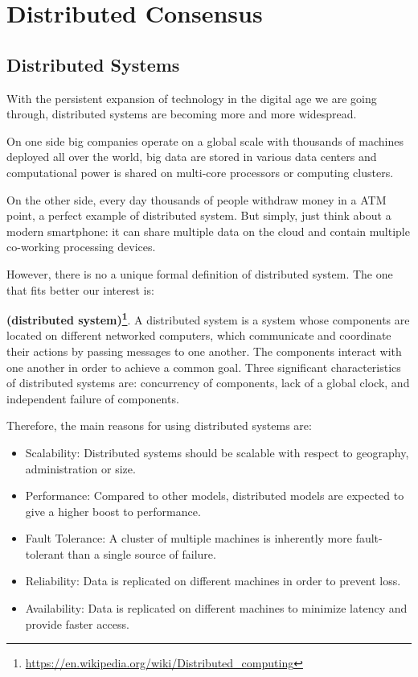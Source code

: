 \chapter{Distributed Consensus}
\label{chpr:consensus}

\bigskip
\section{Distributed Systems}
With the persistent expansion of technology in the digital age we are going through, distributed systems are becoming more and more widespread.

\bigskip
\noindent
On one side big companies operate on a global scale with thousands of machines deployed all over the world, big data are stored in various data centers and computational power is shared on multi-core processors or computing clusters.

\bigskip
\noindent
On the other side, every day thousands of people withdraw money in a ATM point, a perfect example of distributed system. But simply, just think about a modern smartphone: it can share multiple data on the cloud and contain multiple co-working processing devices.

\bigskip
\noindent
However, there is no a unique formal definition of distributed system. The one that fits better our interest is:
\begin{mydef} {\bf (distributed system)\footnote{\url{https://en.wikipedia.org/wiki/Distributed_computing}}}.
    A distributed system is a system whose components are located on different networked computers, which communicate and coordinate their actions by passing messages to one another. The components interact with one another in order to achieve a common goal. Three significant characteristics of distributed systems are: concurrency of components, lack of a global clock, and independent failure of components.
\end{mydef}

\bigskip
\noindent
Therefore, the main reasons for using distributed systems are:
\begin{itemize}
    \item Scalability: Distributed systems should be scalable with respect to geography, administration or size.
    \item Performance: Compared to other models, distributed models are expected to give a higher boost to performance.
    \item Fault Tolerance: A cluster of multiple machines is inherently more fault-tolerant than a single source of failure.
    \item Reliability: Data is replicated on different machines in order to prevent loss.
    \item Availability: Data is replicated on different machines to minimize latency and provide faster access.
\end{itemize}

